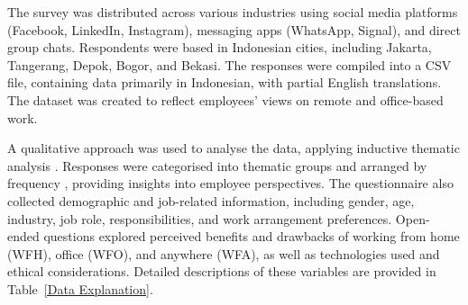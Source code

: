 \documentclass{infotel}
\begin{document}
The survey was distributed across various industries using social media platforms (Facebook, LinkedIn, Instagram), messaging apps (WhatsApp, Signal), and direct group chats. Respondents were based in Indonesian cities, including Jakarta, Tangerang, Depok, Bogor, and Bekasi. The responses were compiled into a CSV file, containing data primarily in Indonesian, with partial English translations. The dataset was created to reflect employees' views on remote and office-based work.

A qualitative approach was used to analyse the data, applying inductive thematic analysis \cite{hamilton2019qualitative,kumar2018qualitative}. Responses were categorised into thematic groups and arranged by frequency \cite{seixas2018qualitative,turale2020brief}, providing insights into employee perspectives. The questionnaire also collected demographic and job-related information, including gender, age, industry, job role, responsibilities, and work arrangement preferences. Open-ended questions explored perceived benefits and drawbacks of working from home (WFH), office (WFO), and anywhere (WFA), as well as technologies used and ethical considerations. Detailed descriptions of these variables are provided in Table~\ref{Data Explanation}.
\end{document}
